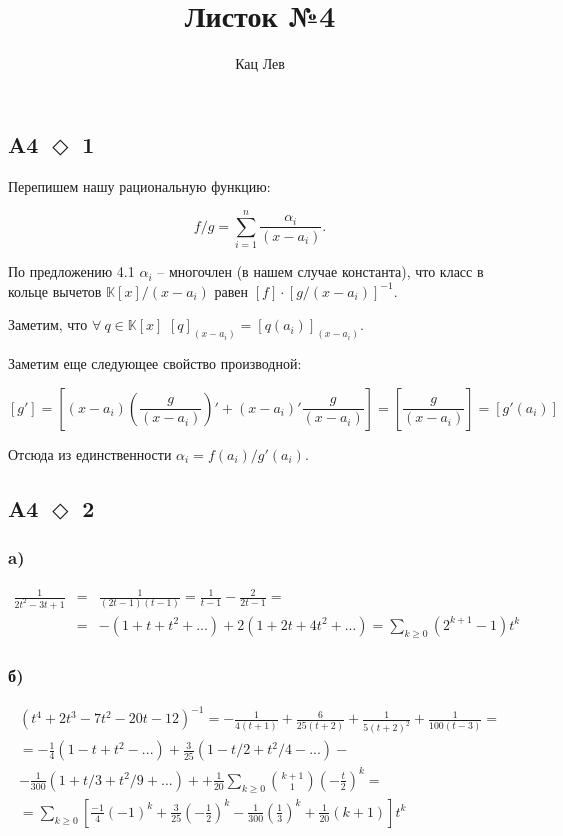 \documentclass[a4paper]{article}
\title{Листок №4}
\author{Кац Лев}
\newcommand{\task}[2]{A#1 $\Diamond$ #2}
\begin{document}
  \maketitle
  \subsection*{\task{4}{1}}
  Перепишем нашу рациональную функцию:

  $$f/g = \sum_{i = 1}^n \frac{\alpha_i}{(x - a_i)}.$$

  По предложению 4.1 $\alpha_i$ -- многочлен (в нашем случае константа), что класс в кольце вычетов $\mathbb{K}\left[x\right]/(x - a_i)$ равен $\left[f\right] \cdot [g/(x - a_i)]^{-1}$.

  Заметим, что $\forall \: q \in \mathbb{K}\left[x\right]$ $\left[q\right]_{(x - a_i)} = \left[q(a_i)\right]_{(x - a_i)}$.

  Заметим еще следующее свойство производной:

  $$\left[g'\right] = \left[(x - a_i) \left(\frac{g}{(x - a_i)}\right)' + (x - a_i)' \frac{g}{(x - a_i)}\right] = \left[\frac{g}{(x - a_i)}\right] = \left[g'(a_i)\right]$$

  Отсюда из единственности $\alpha_i = f(a_i)/g'(a_i)$.

  \subsection*{\task{4}{2}}
  \subsubsection*{a)}
  \begin{eqnarray*}
      \frac{1}{2t^2 - 3t + 1} &=& \frac{1}{(2t - 1)(t - 1)} = \frac{1}{t - 1} - \frac{2}{2t - 1} =\\
      &=& -(1 + t + t^2 + ...) + 2 (1 + 2t + 4t^2 + ...) = \sum_{k \ge 0} (2^{k + 1} - 1) t^k
  \end{eqnarray*}
  \subsubsection*{б)}
  \begin{eqnarray*}
      (t^4 + 2t^3 - 7t^2 - 20t - 12)^{-1} = -\frac{1}{4(t + 1)} + \frac{6}{25(t + 2)} + \frac{1}{5(t + 2)^2} + \frac{1}{100(t - 3)} =\\
      = -\frac{1}{4}(1 - t + t^2 - ...) + \frac{3}{25}(1 - t/2 + t^2/4 - ...) -\\- \frac{1}{300}(1 + t/3 + t^2/9 + ...) +
      + \frac{1}{20}\sum_{k \ge 0} \binom{k + 1}{1} \left(-\frac{t}{2}\right)^k = \\
      = \sum_{k \ge 0} \left[\frac{-1}{4}(-1)^k + \frac{3}{25}\left(-\frac{1}{2}\right)^k - \frac{1}{300}\left(\frac{1}{3}\right)^k + \frac{1}{20}(k  + 1)\right]t^k
  \end{eqnarray*}
\end{document}
